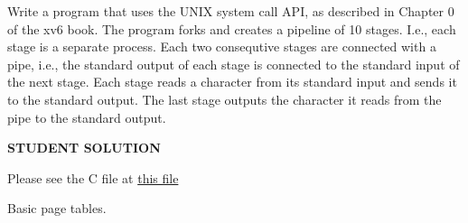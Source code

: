 \documentclass[11pt]{exam}
\begin{document}
\begin{questions}
\begin{parts}
Write a program that uses the UNIX system call API, as described in Chapter 0
of the xv6 book. The program forks and creates a pipeline of 10 stages.
I.e., each stage is a separate process. Each two consequtive stages are
connected with a pipe, i.e., the standard output of each stage is connected to the 
standard input of the next stage. Each stage reads a character from its standard
input and sends it to the standard output. The last stage outputs the
character it reads from the pipe to the standard output. 

\textbf{STUDENT SOLUTION } 
\begin{adjustwidth}{1.5em}{1em}
Please see the C file at \href{https://github.com/StrayBird-ATSH/OperatingSystemCourseMidTermExams/blob/master/Fall\%202018/Fall2018Mid-TenLevelPipe.c}{this file}
\end{adjustwidth}
\vfill

\vfill 


\end{parts} 

\addpoints

\newpage
\question Basic page tables.

\end{questions}
\end{document}

